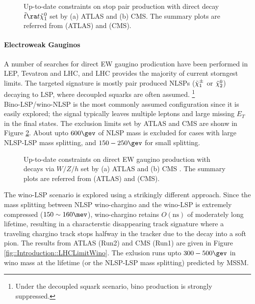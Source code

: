 \begin{figure}[h]
  \centering
    \caption{Up-to-date constraints on stop pair production with direct decay $\ttop \ra t \tilde{\chi}_1^0$ set by (a) ATLAS and (b) CMS.
      The summary plots are referred from \cite{ATLAS_SUSY_PublicResult} (ATLAS) and \cite{CMS_SUSY_PubResult} (CMS).
    }
    \label{fig::Introduction::LHCLimitStop}
\end{figure}


\clearpage
\paragraph{Electroweak Gauginos}
A number of searches for direct EW gaugino prodicution have been performed in LEP, Tevatron and LHC, and LHC provides the majority of current storngest limits. 
The targeted signature is mostly pair produced NLSPs ($\tilde{\chi}_{1}^{\pm}$ or $\tilde{\chi}_{2}^{0}$) decaying to LSP, where decoupled squarks are often assumed. 
\footnote{Under the decoupled squark scenario, bino production is strongly suppressed.} \\

Bino-LSP/wino-NLSP is the most commonly assumed configuration since it is easily explored; 
the signal typically leaves multiple leptons and large missing $E_{T}$ in the final states.
The exclusion limits set by ATLAS and CMS are shonw in Figure \ref{fig::Introduction::LHCLimitEWKino}.
About upto $600\gev$ of NLSP mass is excluded for cases with large NLSP-LSP mass splitting, and $150-250\gev$ for small splitting.  

\begin{figure}[h]
  \centering
    \caption{Up-to-date constraints on direct EW gaugino production with decays via $W/Z/h$ set by (a) ATLAS \cite{ATLAS_SUSY_EW2L3L} and (b) CMS \cite{CMS_SUSY_EWK2L3L}.
      The summary plots are referred from \cite{ATLAS_SUSY_PublicResult} (ATLAS) and \cite{CMS_SUSY_PubResult} (CMS).
    }
    \label{fig::Introduction::LHCLimitEWKino}
\end{figure}
The wino-LSP scenario is explored using a strikingly different approach. Since the mass splitting between NLSP wino-chargino and the wino-LSP is extremely compressed ($150 \sim 160\mev$), wino-chargino retains $O(\mathrm{ns})$ of moderately long lifetime, resulting in a characterstic disappearing track signature where a traveling chargino track stops halfway in the tracker due to the decay into a soft pion. The results from ATLAS (Run2) and CMS (Run1) are given in Figure \ref{fig::Introduction::LHCLimitWino}.
The exlusion runs upto $300-500\gev$ in wino mass at the lifetime (or the NLSP-LSP mass splitting) predicted by MSSM. \\

